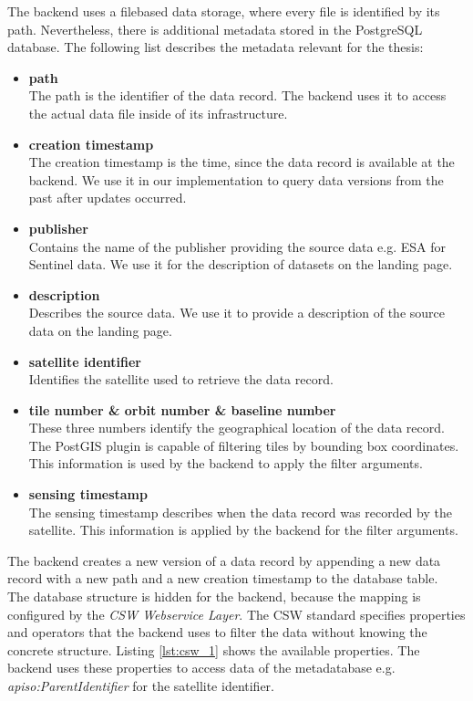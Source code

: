 \documentclass[draft,final]{vutinfth} %
\begin{document}
{The backend uses a filebased data storage, where every file is identified by its path. Nevertheless, there is additional metadata stored in the PostgreSQL database. The following list describes the metadata relevant for the thesis:
\begin{itemize}
	\item \textbf{path} \\
	The path is the identifier of the data record. The backend uses it to access the actual data file inside of its infrastructure. 
	\item \textbf{creation timestamp} \\
	The creation timestamp is the time, since the data record is available at the backend. We use it in our implementation to query data versions from the past after updates occurred. 
	\item \textbf{publisher} \\
	Contains the name of the publisher providing the source data e.g. ESA for Sentinel data. We use it for the description of datasets on the landing page.
	\item \textbf{description} \\
	Describes the source data. We use it to provide a description of the source data on the landing page.
	\item \textbf{satellite identifier} \\
	Identifies the satellite used to retrieve the data record. 
	\item \textbf{tile number \& orbit number \& baseline number} \\
	These three numbers identify the geographical location of the data record. The PostGIS plugin is capable of filtering tiles by bounding box coordinates. This information is used by the backend to apply the filter arguments.  
	\item \textbf{sensing timestamp} \\
	The sensing timestamp describes when the data record was recorded by the satellite. This information is applied by the backend for the filter arguments.  
\end{itemize}

The backend creates a new version of a data record by appending a new data record with a new path and a new creation timestamp to the database table. \\  
The database structure is hidden for the backend, because the mapping is configured by the \textit{CSW Webservice Layer}. The CSW standard specifies properties and operators that the backend uses to filter the data without knowing the concrete structure. Listing \ref{lst:csw_1} shows the available properties. The backend uses these properties to access data of the metadatabase e.g. \textit{apiso:ParentIdentifier} for the satellite identifier. 
}
\end{document}
